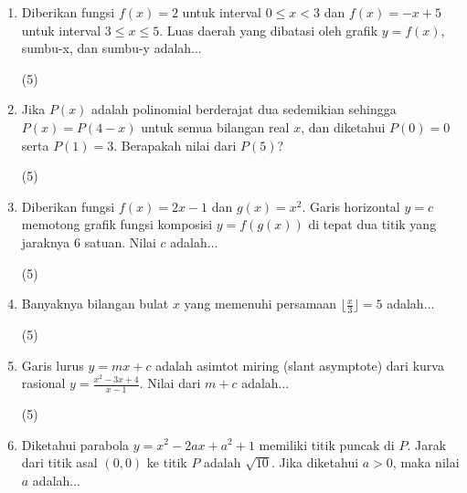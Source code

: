 \documentclass[12pt]{scrartcl}
\begin{document}
\begin{enumerate}
\item Diberikan fungsi $f(x) = 2$ untuk interval $0 \le x < 3$ dan $f(x) = -x + 5$ untuk interval $3 \le x \le 5$. Luas daerah yang dibatasi oleh grafik $y = f(x)$, sumbu-x, dan sumbu-y adalah...

\begin{tasks}[label=\Alph*](5)     
\end{tasks}

\item Jika $P(x)$ adalah polinomial berderajat dua sedemikian sehingga $P(x) = P(4-x)$ untuk semua bilangan real $x$, dan diketahui $P(0) = 0$ serta $P(1) = 3$. Berapakah nilai dari $P(5)$?

\begin{tasks}[label=\Alph*](5)     
\end{tasks}

\item Diberikan fungsi $f(x) = 2x - 1$ dan $g(x) = x^2$. Garis horizontal $y = c$ memotong grafik fungsi komposisi $y = f(g(x))$ di tepat dua titik yang jaraknya 6 satuan. Nilai $c$ adalah...

\begin{tasks}[label=\Alph*](5)     
\end{tasks}

\item Banyaknya bilangan bulat $x$ yang memenuhi persamaan $\lfloor \frac{x}{3} \rfloor = 5$ adalah...

\begin{tasks}[label=\Alph*](5)     
\end{tasks}

\item Garis lurus $y = mx + c$ adalah asimtot miring (slant asymptote) dari kurva rasional $y = \frac{x^2 - 3x + 4}{x-1}$. Nilai dari $m + c$ adalah...

\begin{tasks}[label=\Alph*](5)     
\end{tasks}

\item Diketahui parabola $y = x^2 - 2ax + a^2 + 1$ memiliki titik puncak di $P$. Jarak dari titik asal $(0,0)$ ke titik $P$ adalah $\sqrt{10}$. Jika diketahui $a > 0$, maka nilai $a$ adalah...


\end{enumerate}
\end{document}
